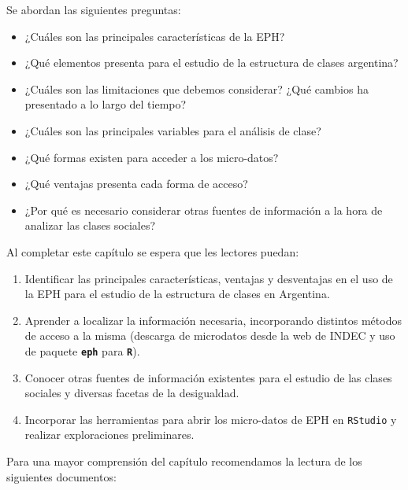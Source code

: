 \documentclass[
]{article}
\providecommand{\tightlist}{%
  \setlength{\itemsep}{0pt}\setlength{\parskip}{0pt}}
\begin{document}
Se abordan las siguientes preguntas:

\begin{itemize}
\tightlist
\item
  ¿Cuáles son las principales características de la EPH?
\item
  ¿Qué elementos presenta para el estudio de la estructura de clases argentina?
\item
  ¿Cuáles son las limitaciones que debemos considerar? ¿Qué cambios ha presentado a lo largo del tiempo?
\item
  ¿Cuáles son las principales variables para el análisis de clase?
\item
  ¿Qué formas existen para acceder a los micro-datos?
\item
  ¿Qué ventajas presenta cada forma de acceso?
\item
  ¿Por qué es necesario considerar otras fuentes de información a la hora de analizar las clases sociales?
\end{itemize}

Al completar este capítulo se espera que les lectores puedan:

\begin{enumerate}
\def\labelenumi{\arabic{enumi}.}
\tightlist
\item
  Identificar las principales características, ventajas y desventajas en el uso de la EPH para el estudio de la estructura de clases en Argentina.
\item
  Aprender a localizar la información necesaria, incorporando distintos métodos de acceso a la misma (descarga de microdatos desde la web de INDEC y uso de paquete \textbf{\texttt{eph}} para \textbf{\texttt{R}}).
\item
  Conocer otras fuentes de información existentes para el estudio de las clases sociales y diversas facetas de la desigualdad.
\item
  Incorporar las herramientas para abrir los micro-datos de EPH en \texttt{RStudio} y realizar exploraciones preliminares.
\end{enumerate}

Para una mayor comprensión del capítulo recomendamos la lectura de los siguientes documentos:
\end{document}
